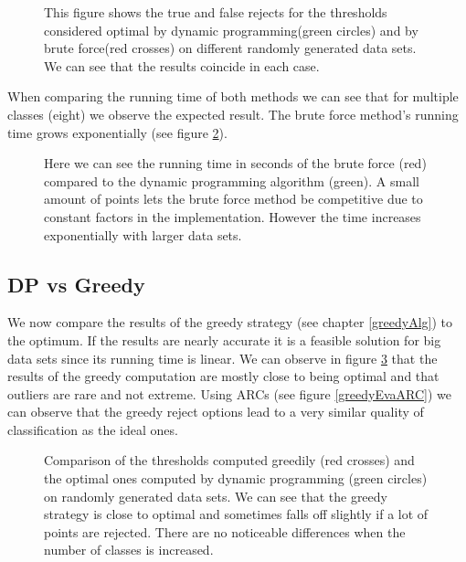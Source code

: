 \begin{figure}[!htbp]
\centering
\caption{This figure shows the true and false rejects for the thresholds considered optimal by dynamic programming(green circles) and by brute force(red crosses) on different randomly generated data sets. We can see that the results coincide in each case. }
\label{dpEvaPareto}
\end{figure}

When comparing the running time of both methods we can see that for multiple classes (eight) we observe the expected result. The brute force method's running time grows exponentially (see figure \ref{runTime}).

\begin{figure}[!htbp]
\centering
\caption{Here we can see the running time in seconds of the brute force (red) compared to the dynamic programming algorithm (green). A small amount of points lets the brute force method be competitive due to constant factors in the implementation. However the time increases exponentially with larger data sets.}
\label{runTime}
\end{figure}

\subsection{DP vs Greedy}
\label{DPvsGR}
We now compare the results of the greedy strategy (see chapter \ref{greedyAlg}) to the optimum. If the results are nearly accurate it is a feasible solution for big data sets since its running time is linear. We can observe in figure \ref{greedyEvaPareto} that the results of the greedy computation are mostly close to being optimal and that outliers are rare and not extreme. Using ARCs (see figure \ref{greedyEvaARC}) we can observe that the greedy reject options lead to a very similar quality of classification as the ideal ones.

\begin{figure}[!htbp]
\centering
\caption{Comparison of the thresholds computed greedily (red crosses) and the optimal ones computed by dynamic programming (green circles) on randomly generated data sets. We can see that the greedy strategy is close to optimal and sometimes falls off slightly if a lot of points are rejected. There are no noticeable differences when the number of classes is increased.}
\label{greedyEvaPareto}
\end{figure}



